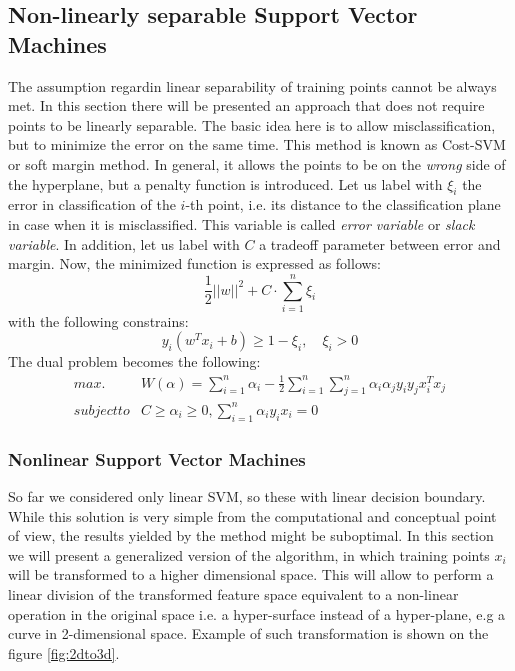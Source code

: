 \subsection{Non-linearly separable Support Vector Machines}
The assumption regardin linear separability of training points cannot be always met. In this section there will be presented an approach that does not require points to be linearly separable. The basic idea here is to allow misclassification, but to minimize the error on the same time. This method is known as Cost-SVM or soft margin method. In general, it allows the points to be on the \textit{wrong} side of the hyperplane, but a penalty function is introduced.
Let us label with $\xi_i$ the error in classification of the $i$-th point, i.e. its distance to the classification plane in case when it is misclassified. This variable is called \textit{error variable} or \textit{slack variable}. In addition, let us label with $C$ a tradeoff parameter between error and margin. Now, the minimized function is expressed as follows:
\begin{equation}
\frac{1}{2}||w||^2 + C \cdot \sum_{i=1}^{n}\xi_i
\end{equation}
with the following constrains:
\begin{equation}
y_i \left(w^Tx_i+b\right) \ge 1-\xi_i, \quad \xi_i>0
\end{equation}
The dual problem becomes the following:
\begin{align*}
max. & W(\alpha) = \sum_{i=1}^{n}\alpha_i-\frac{1}{2}\sum_{i=1}^{n}\sum_{j=1}^{n}\alpha_i\alpha_jy_iy_jx^T_ix_j \\
subject to & C \ge \alpha_i \ge 0, \sum_{i=1}^{n}\alpha_iy_ix_i=0
\end{align*}

\subsubsection{Nonlinear Support Vector Machines}
So far we considered only linear SVM, so these with linear decision boundary. While this solution is very simple from the computational and conceptual point of view, the results yielded by the method might be suboptimal. In this section we will present a generalized version of the algorithm, in which training points $x_i$ will be transformed to a higher dimensional space. This will allow to perform a linear division of the transformed feature space equivalent to a non-linear operation in the original space i.e. a hyper-surface instead of a hyper-plane, e.g a curve in 2-dimensional space. Example of such transformation is shown on the figure \ref{fig:2dto3d}.

